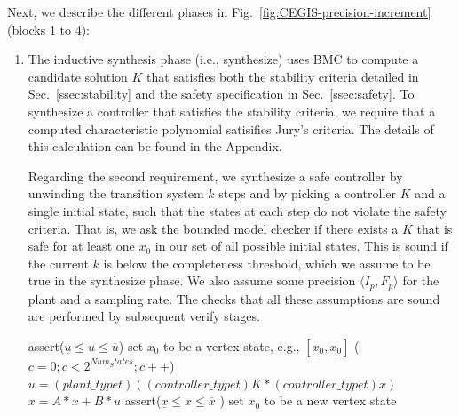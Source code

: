 \documentclass[runningheads,a4paper]{llncs}
\begin{document}
\medskip

Next, we describe the different phases in Fig.~\ref{fig:CEGIS-precision-increment}
(blocks 1 to 4):

\begin{enumerate}
\item The inductive synthesis phase (i.e., {\sc synthesize}) uses BMC to
compute a candidate solution $K$
that satisfies both the stability criteria detailed in 
Sec.~\ref{ssec:stability} and the safety specification in Sec.~\ref{ssec:safety}.
To synthesize a controller that satisfies the stability criteria, we require that
a computed characteristic polynomial satisifies Jury's criteria. The details of this
calculation can be found in the Appendix.

Regarding the second requirement, we synthesize a safe controller by unwinding the transition system
$k$ steps and by picking a controller $K$ and a single initial state,  such that the states at each step do
not violate the safety criteria. That is, we ask the bounded model checker if there exists a $K$ that is safe for at least one $x_0$ in our set of all possible initial states. This is sound if the current $k$ is below the
completeness threshold, which we assume to be true in the {\sc synthesize} phase.
We also assume some
precision $\langle I_p,F_p\rangle$ for the plant and a sampling rate.  The
checks that all these assumptions are sound are performed by subsequent
{\sc verify} stages.



\begin{algorithm}[]
\scriptsize
\begin{algorithmic}[1]
\State assert($ \underline{u}  \leq u \leq \overline{u}$)
 \State set $x_0$ to be a vertex state, e.g., $[\underline{x_0},\underline{x_0}]$	
\While ($c=0; c < 2^{Num_States}; c++$)
		\State $u = (plant\_typet)((controller\_typet)K * (controller\_typet) x)$
		\State $x = A * x + B * u$
		\State assert($\underline{x} \leq x \leq \overline{x}$ )
  	\EndWhile
  	\State set $x_0$ to be a new vertex state
  	\EndWhile
\EndFunction
\end{algorithmic}
\label{alg:safetycheck}
\end{algorithm}


\end{enumerate}
\end{document}
